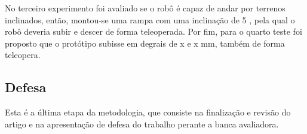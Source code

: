 \documentclass[../main.tex]{subfiles}
\begin{document}
  No terceiro experimento foi avaliado se o robô é capaz de andar por terrenos inclinados, então, montou-se uma rampa com uma inclinação de 5 \degree, pela qual o robô deveria subir e descer de forma teleoperada. Por fim, para o quarto teste foi proposto que o protótipo subisse em degrais de x e x mm, também de forma teleopera.

  \subsection{Defesa}
  Esta é a última etapa da metodologia, que consiste na finalização e revisão do artigo e na apresentação de defesa do trabalho perante a banca avaliadora. 
\end{document}
